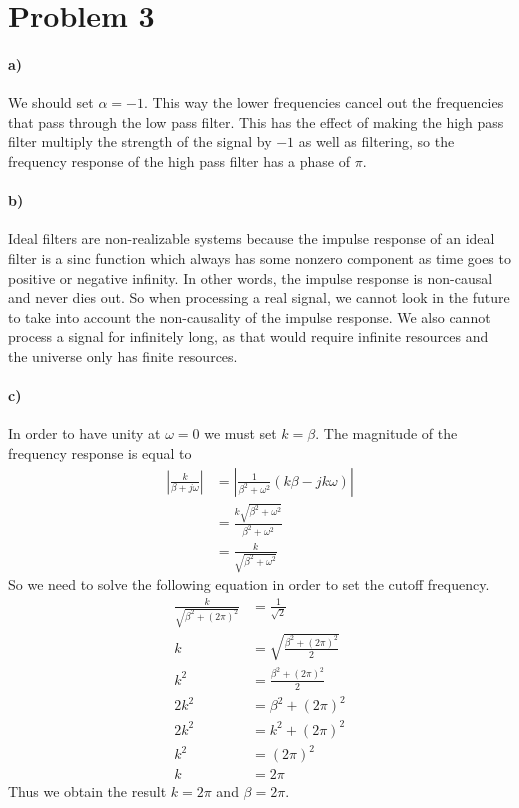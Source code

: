 \documentclass[12pt]{article}
\begin{document}
\section*{Problem 3}

\paragraph{a)}

We should set \(\alpha=-1\). This way the lower frequencies cancel out the frequencies that pass through the low pass filter. This has the effect of making the high pass filter multiply the strength
of the signal by \(-1\) as well as filtering, so the frequency response of the high pass filter has a phase of \(\pi\).

\paragraph{b)}

Ideal filters are non-realizable systems because the impulse response of an ideal filter is a sinc function which always has some nonzero component as time goes to positive or negative infinity.
In other words, the impulse response is non-causal and never dies out. So when processing a real signal, we cannot look in the future to take into account the non-causality of the impulse response. We also
cannot process a signal for infinitely long, as that would require infinite resources and the universe only has finite resources.

\paragraph{c)}

In order to have unity at \(\omega=0\) we must set \(k=\beta\). The magnitude of the frequency response is equal to
\begin{align*}
    \left|\frac{k}{\beta+j\omega}\right|&=\left|\frac{1}{\beta^2+\omega^2}(k\beta-jk\omega)\right|\\
    &=\frac{k\sqrt{\beta^2+\omega^2}}{\beta^2+\omega^2}\\
    &=\frac{k}{\sqrt{\beta^2+\omega^2}}
\end{align*}
So we need to solve the following equation in order to set the cutoff frequency.
\begin{align*}
    \frac{k}{\sqrt{\beta^2+(2\pi)^2}}&=\frac{1}{\sqrt{2}}\\
    k&=\sqrt{\frac{\beta^2+(2\pi)^2}{2}}\\
    k^2&=\frac{\beta^2+(2\pi)^2}{2}\\
    2k^2&=\beta^2+(2\pi)^2\\
    2k^2&=k^2+(2\pi)^2\\
    k^2&=(2\pi)^2\\
    k&=2\pi
\end{align*}
Thus we obtain the result \(k=2\pi\) and \(\beta=2\pi\).
\end{document}
